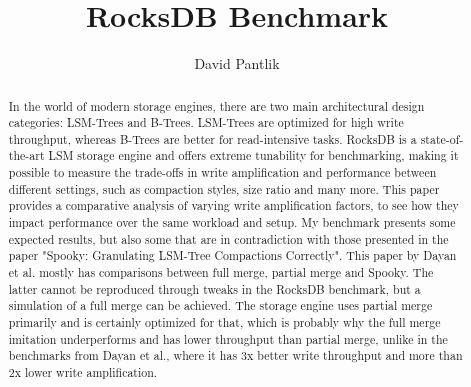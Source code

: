 \documentclass[sigconf]{acmart}
\begin{document}
\title{RocksDB Benchmark}

\author{David Pantlik}



\vspace{2em}
\begin{abstract}
 
In the world of modern storage engines, there are two main architectural design categories: LSM-Trees and B-Trees. LSM-Trees are optimized for high write throughput, whereas B-Trees are better for read-intensive tasks. RocksDB is a state-of-the-art LSM storage engine and offers extreme tunability for benchmarking, making it possible to measure the trade-offs in write amplification and performance between different settings, such as compaction styles, size ratio and many more. This paper provides a comparative analysis of varying write amplification factors, to see how they impact performance over the same workload and setup. My benchmark presents some expected results, but also some that are in contradiction with those presented in the paper "Spooky: Granulating LSM-Tree Compactions Correctly"\cite{Spooky}. This paper by Dayan et al. mostly has comparisons between full merge, partial merge and Spooky. The latter cannot be reproduced through tweaks in the RocksDB benchmark, but a simulation of a full merge can be achieved. The storage engine uses partial merge primarily and is certainly optimized for that, which is probably why the full merge imitation underperforms and has lower throughput than partial merge, unlike in the benchmarks from Dayan et al., where it has 3x better write throughput and more than 2x lower write amplification.
\end{abstract}




\maketitle

\pagestyle{plain}
\end{document}
